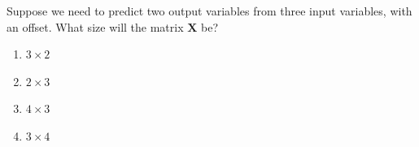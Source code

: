 \documentclass[11pt]{article}
\newcommand\xmtx{\boldsymbol{X}}
\begin{document}
Suppose we need to predict two output variables from three input
variables, with an offset.  What size will the matrix $\xmtx$ be?
\begin{enumerate}
    \item $3 \times 2$
    \item $2 \times 3$
    \item $4 \times 3$
    \item $3 \times 4$
\end{enumerate}



\end{document}
